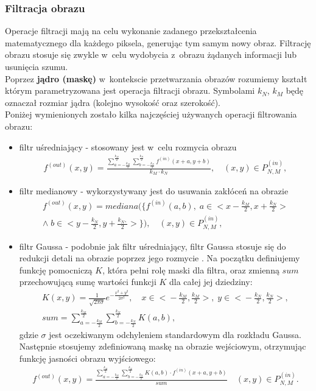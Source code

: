\subsubsection{Filtracja obrazu}
Operacje filtracji mają na celu wykonanie zadanego przekształcenia matematycznego dla każdego piksela, generując tym samym nowy obraz. Filtrację obrazu stosuje się zwykle w~celu wydobycia z~obrazu żądanych informacji lub usunięcia szumu. \\
Poprzez \textbf{jądro (maskę)} w~kontekscie przetwarzania obrazów rozumiemy kształt którym parametryzowana jest operacja filtracji obrazu. Symbolami $k_N$, $k_M$ będę oznaczał rozmiar jądra (kolejno wysokość oraz szerokość).\\
Poniżej wymienionych zostało kilka najczęściej używanych operacji filtrowania obrazu:
\begin{itemize}
\item filtr uśredniający - stosowany jest w~celu rozmycia obrazu
  \begin{gather*}
    f^{(out)}(x, y) = \frac{\sum\limits_{a=-\frac{k_M}{2}}^{\frac{k_M}{2}} \sum\limits_{b=-\frac{k_N}{2}}^{\frac{k_N}{2}} f^{(in)}(x + a, y + b)}{k_M \cdot k_N}, \quad (x, y) \in P^{(in)}_{N,M},
  \end{gather*}
\item filtr medianowy - wykorzystywany jest do usuwania zakłóceń na obrazie \cite{pratt75}
  \begin{gather*}
    f^{(out)}(x, y) = mediana(\{f^{(in)}(a, b), \;a \in \big< x -\frac{k_M}{2}, x + \frac{k_N}{2}\big> \\
    \wedge\; b \in \big< y - \frac{k_N}{2}, y + \frac{k_N,}{2}\big>\}), \quad (x, y) \in P^{(in)}_{N,M},
  \end{gather*}
\item filtr Gaussa - podobnie jak filtr uśredniający, filtr Gaussa stosuje się do redukcji detali na obrazie poprzez jego rozmycie \cite{shapiro01}. Na początku definiujemy funkcję pomocniczą $K$, która pełni rolę maski dla filtra, oraz zmienną $sum$ przechowującą sumę wartości funkcji $K$ dla całej jej dziedziny:
  \begin{gather*}
    K(x, y) = \frac{1}{\sqrt{2 \pi \sigma}} e^{-\frac{x^2+y^2}{2 \sigma^2}}, \quad x \in \big< -\frac{k_M}{2}, \frac{k_M}{2} \big>, \; y \in \big< -\frac{k_N}{2}, \frac{k_N}{2} \big>, \\
    sum = \sum\limits_{a=-\frac{k_M}{2}}^{\frac{k_M}{2}} \sum\limits_{b=-\frac{k_N}{2}}^{\frac{k_N}{2}} K(a, b),
  \end{gather*} 
  gdzie $\sigma$ jest oczekiwanym odchyleniem standardowym dla rozkładu Gaussa.
  Następnie stosujemy zdefiniowaną maskę na obrazie wejściowym, otrzymując funkcję jasności obrazu wyjściowego:
  \begin{gather*}
    f^{(out)}(x, y) = \frac{\sum\limits_{a=-\frac{k_M}{2}}^{\frac{k_M}{2}} \sum\limits_{b=-\frac{k_N}{2}}^{\frac{k_N}{2}} K(a, b) \cdot f^{(in)}(x + a, y + b)}{sum}\quad (x, y) \in P^{(in)}_{N,M}.
  \end{gather*}
\end{itemize}

